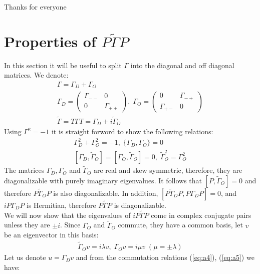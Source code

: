\documentclass[%
 reprint,
 amsmath,amssymb,
 aps,
]{revtex4-2}
\begin{document}
\begin{acknowledgments}
Thanks for everyone
\end{acknowledgments}

\appendix

\section{Properties of $P\tilde\Gamma P$}
\label{app:p_gamma_p}

In this section it will be useful to split $\Gamma$ into the diagonal and off diagonal matrices. We denote:
\begin{align}
    \Gamma=\Gamma_D + \Gamma_O \\
    \Gamma_D=\begin{pmatrix}\Gamma_{--} & 0 \\ 0 & \Gamma_{++} \end{pmatrix}, \;
    \Gamma_O=\begin{pmatrix}0 & \Gamma_{-+} \\ \Gamma_{+-} & 0 \end{pmatrix} \\
    \tilde\Gamma = T\Gamma T=\Gamma_D + i\tilde\Gamma_O
\end{align}
Using $\Gamma^2=-1$ it is straight forword to show the following relations:
\begin{align}
    \Gamma_D^2 + \Gamma_O^2 = -1, \; \{\Gamma_D,\Gamma_O\}=0 \label{eq:a4} \\
    [\Gamma_D,\tilde\Gamma_O]=[\Gamma_O,\tilde\Gamma_O]=0, \; \tilde\Gamma_O^2=\Gamma_O^2 \label{eq:a5}
\end{align}
The matrices $\Gamma_D,\Gamma_O$ and $\tilde\Gamma_O$ are real and skew symmetric, therefore, they are diagonalizable with purely imaginary eigenvalues. It follows that $[P,\tilde\Gamma_O]=0$ and therefore $P\tilde\Gamma_OP$ is also diagonalizable. In addition, $[P\tilde\Gamma_OP, P\Gamma_DP]=0$, and $iP\Gamma_DP$ is Hermitian, therefore $P\tilde\Gamma P$ is diagonalizable.\\
We will now show that the eigenvalues of $iP\tilde\Gamma P$ come in complex conjugate pairs unless they are $\pm i$. Since $\Gamma_O$ and $\tilde\Gamma_O$ commute, they have a common basis, let $v$ be an eigenvector in this basis:
\begin{align}
    \tilde\Gamma_Ov=i\lambda v, \; \Gamma_Ov=i\mu v \; (\mu=\pm\lambda)
\end{align}
Let us denote $u=\Gamma_Dv$ and from the commutation relations (\ref{eq:a4}), (\ref{eq:a5}) we have:
\end{document}
